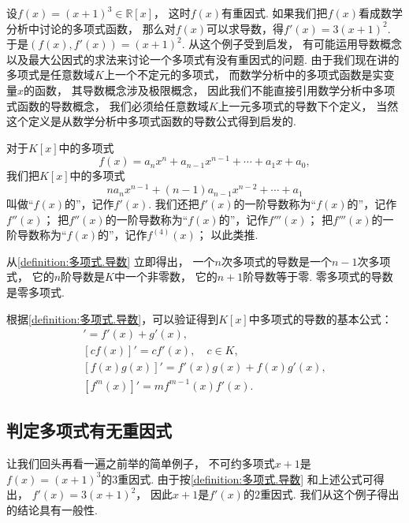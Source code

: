 设\(f(x) = (x+1)^3 \in \mathbb{R}[x]\)，
这时\(f(x)\)有重因式.
如果我们把\(f(x)\)看成数学分析中讨论的多项式函数，
那么对\(f(x)\)可以求导数，得\(f'(x) = 3(x+1)^2\).
于是\((f(x),f'(x)) = (x+1)^2\).
从这个例子受到启发，
有可能运用导数概念以及最大公因式的求法来讨论一个多项式有没有重因式的问题.
由于我们现在讲的多项式是任意数域\(K\)上一个不定元的多项式，
而数学分析中的多项式函数是实变量\(x\)的函数，
其导数概念涉及极限概念，
因此我们不能直接引用数学分析中多项式函数的导数概念，
我们必须给任意数域\(K\)上一元多项式的导数下个定义，
当然这个定义是从数学分析中多项式函数的导数公式得到启发的.

\begin{definition}\label{definition:多项式.导数}
对于\(K[x]\)中的多项式\[
	f(x) = a_n x^n + a_{n-1} x^{n-1} + \dotsb + a_1 x + a_0,
\]
我们把\(K[x]\)中的多项式\[
	n a_n x^{n-1} + (n-1) a_{n-1} x^{n-2} + \dotsb + a_1
\]
叫做“\(f(x)\)的”，记作\(f'(x)\).
我们还把\(f'(x)\)的一阶导数称为“\(f(x)\)的”，记作\(f''(x)\)；
把\(f''(x)\)的一阶导数称为“\(f(x)\)的”，记作\(f'''(x)\)；
把\(f'''(x)\)的一阶导数称为“\(f(x)\)的”，记作\(f^{(4)}(x)\)；
以此类推.
\end{definition}

从\cref{definition:多项式.导数} 立即得出，
一个\(n\)次多项式的导数是一个\(n-1\)次多项式，
它的\(n\)阶导数是\(K\)中一个非零数，
它的\(n+1\)阶导数等于零.
零多项式的导数是零多项式.

根据\cref{definition:多项式.导数}，可以验证得到\(K[x]\)中多项式的导数的基本公式：\begin{gather}
	[f(x)+g(x)]' = f'(x) + g'(x), \\
	[c f(x)]' = c f'(x), \quad c \in K, \\
	[f(x) g(x)]' = f'(x) g(x) + f(x) g'(x), \\
	[f^m(x)]' = m f^{m-1}(x) f'(x).
\end{gather}

\subsection{判定多项式有无重因式}
让我们回头再看一遍之前举的简单例子，
不可约多项式\(x+1\)是\(f(x) = (x+1)^3\)的\(3\)重因式.
由于按\cref{definition:多项式.导数} 和上述公式可得出，
\(f'(x) = 3(x+1)^2\)，
因此\(x+1\)是\(f'(x)\)的\(2\)重因式.
我们从这个例子得出的结论具有一般性.

